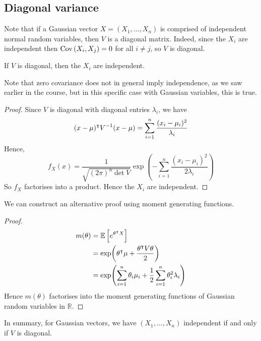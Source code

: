 \subsection{Diagonal variance}
Note that if a Gaussian vector \(X = (X_1, \dots, X_n)\) is comprised of independent normal random variables, then \(V\) is a diagonal matrix.
Indeed, since the \(X_i\) are independent then \(\operatorname{Cov}\left({X_i, X_j}\right) = 0\) for all \(i \neq j\), so \(V\) is diagonal.
\begin{lemma}
	If \(V\) is diagonal, then the \(X_i\) are independent.
\end{lemma}
Note that zero covariance does not in general imply independence, as we saw earlier in the course, but in this specific case with Gaussian variables, this is true.
\begin{proof}
	Since \(V\) is diagonal with diagonal entries \(\lambda_i\), we have
	\[
		(x-\mu)^\intercal V^{-1} (x-\mu) = \sum_{i=1}^n \frac{(x_i - \mu_i)^2}{\lambda_i}
	\]
	Hence,
	\[
		f_X(x) = \frac{1}{\sqrt{(2\pi)^n \det V}} \exp(-\sum_{i=1}^n \frac{(x_i - \mu_i)^2}{2\lambda_i})
	\]
	So \(f_X\) factorises into a product.
	Hence the \(X_i\) are independent.
\end{proof}
We can construct an alternative proof using moment generating functions.
\begin{proof}
	\begin{align*}
		m(\theta) & = \mathbb{E}\left[{e^{\theta^\intercal X}}\right]                                                 \\
		          & = \exp(\theta^\intercal \mu + \frac{\theta^\intercal V \theta}{2})               \\
		          & = \exp(\sum_{i=1}^n \theta_i \mu_i + \frac{1}{2}\sum_{i=1}^n \theta_i^2 \lambda_i)
	\end{align*}
	Hence \(m(\theta)\) factorises into the moment generating functions of Gaussian random variables in \(\mathbb R\).
\end{proof}
In summary, for Gaussian vectors, we have \((X_1, \dots, X_n)\) independent if and only if \(V\) is diagonal.

